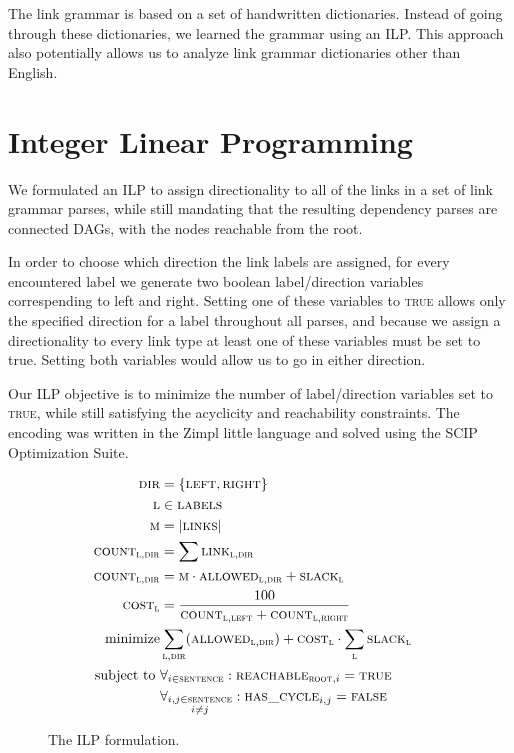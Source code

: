 \documentclass[11pt]{article}
\begin{document}
The link grammar is based on a set of handwritten dictionaries. Instead of going through these dictionaries, we learned the grammar using an ILP. This approach also potentially allows us to analyze link grammar dictionaries other than English.  


\section{Integer Linear Programming}
We formulated an ILP to assign directionality to all of the links in a set of link grammar parses, while still mandating that the resulting dependency parses are connected DAGs, with the nodes reachable from the root. 

In order to choose which direction the link labels are assigned, for every encountered label we generate two boolean label/direction variables correspending to left and right. Setting one of these variables to \textsc{true} allows only the specified direction for a label throughout all parses, and because we assign a directionality to every link type at least one of these variables must be set to true. Setting both variables would allow us to go in either direction.

Our ILP objective is to minimize the number of label/direction variables set to \textsc{true}, while still satisfying the acyclicity and reachability constraints. The encoding was written in the Zimpl little language \cite{Koch2004} and solved using the SCIP Optimization Suite\cite{achterberg2009scip}.


\begin{figure}
  \small
  \begin{align}
    \textsc{dir} &= \{\textsc{left}, \textsc{right}\} &\\ 
    \textsc{l} &\in \textsc{labels} & \\
    \textsc{m} &= \left|{\textsc{links}}\right| &\\
    \textsc{count}_{\textsc{l}, \textsc{dir}} &= \sum \textsc{link}_{\textsc{l},\textsc{dir}} &\\
    \textsc{count}_{\textsc{l}, \textsc{dir}} &= \textsc{m} \cdot \textsc{allowed}_{\textsc{l},\textsc{dir}} + \textsc{slack}_{\textsc{l}} &\\
    \textsc{cost}_{\textsc{l}} &= \frac{100}{\textsc{count}_{\textsc{l},\textsc{left}} + \textsc{count}_{\textsc{l},\textsc{right}}} &\\
    \text{minimize} &\sum_{\textsc{l}, \textsc{dir}} (\textsc{allowed}_{\textsc{l},\textsc{dir}}) + \textsc{cost}_{\textsc{l}} \cdot \sum_\textsc{l} \textsc{slack}_{\textsc{l}} &\\
    \text{subject to } &\forall_{i \in \textsc{sentence}}: \textsc{reachable}_{\textsc{root}, i} = \textsc{true} &\\
                       &\forall_{\substack{i,j \in \textsc{sentence} \\ i\neq j }}: \textsc{has\_cycle}_{i,j} = \textsc{false} &
  \end{align}
  \caption{\small The ILP formulation.}
\end{figure}
\end{document}
